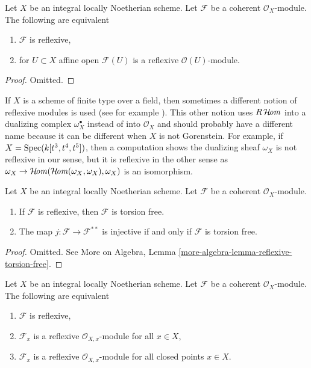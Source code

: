 \begin{lemma}
\label{lemma-check-reflexive-on-affines}
Let $X$ be an integral locally Noetherian scheme. Let $\mathcal{F}$ be a
coherent $\mathcal{O}_X$-module. The following are equivalent
\begin{enumerate}
\item $\mathcal{F}$ is reflexive,
\item for $U \subset X$ affine open $\mathcal{F}(U)$
is a reflexive $\mathcal{O}(U)$-module.
\end{enumerate}
\end{lemma}

\begin{proof}
Omitted.
\end{proof}

\begin{remark}
\label{remark-different-reflexive}
If $X$ is a scheme of finite type over a field, then sometimes a different
notion of reflexive modules is used (see for example
\cite[bottom of page 5 and Definition 1.1.9]{HL}).
This other notion uses $R\mathop{\mathcal{H}\!\mathit{om}}\nolimits$ into a dualizing complex
$\omega_X^\bullet$ instead of into $\mathcal{O}_X$ and
should probably have a different name because it can be different
when $X$ is not Gorenstein. For example, if
$X = \mathop{\mathrm{Spec}}(k[t^3, t^4, t^5])$, then a computation shows the dualizing
sheaf $\omega_X$ is not reflexive in our sense, but it is reflexive in the
other sense as
$\omega_X \to \mathop{\mathcal{H}\!\mathit{om}}\nolimits(\mathop{\mathcal{H}\!\mathit{om}}\nolimits(\omega_X, \omega_X), \omega_X)$
is an isomorphism.
\end{remark}

\begin{lemma}
\label{lemma-reflexive-torsion-free}
Let $X$ be an integral locally Noetherian scheme. Let $\mathcal{F}$
be a coherent $\mathcal{O}_X$-module.
\begin{enumerate}
\item If $\mathcal{F}$ is reflexive, then $\mathcal{F}$ is torsion free.
\item The map $j : \mathcal{F} \longrightarrow \mathcal{F}^{**}$
is injective if and only if $\mathcal{F}$ is torsion free.
\end{enumerate}
\end{lemma}

\begin{proof}
Omitted. See More on Algebra, Lemma
\ref{more-algebra-lemma-reflexive-torsion-free}.
\end{proof}

\begin{lemma}
\label{lemma-check-reflexive}
Let $X$ be an integral locally Noetherian scheme.
Let $\mathcal{F}$ be a coherent $\mathcal{O}_X$-module.
The following are equivalent
\begin{enumerate}
\item $\mathcal{F}$ is reflexive,
\item $\mathcal{F}_x$ is a reflexive $\mathcal{O}_{X, x}$-module
for all $x \in X$,
\item $\mathcal{F}_x$ is a reflexive $\mathcal{O}_{X, x}$-module
for all closed points $x \in X$.
\end{enumerate}
\end{lemma}

